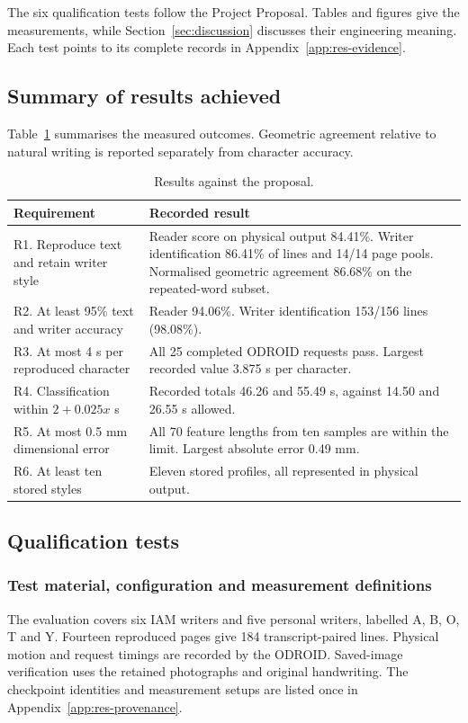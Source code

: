 \label{sec:results}
The six qualification tests follow the Project Proposal. Tables and figures give the measurements, while Section~\ref{sec:discussion} discusses their engineering meaning. Each test points to its complete records in Appendix~\ref{app:res-evidence}.

\subsection{Summary of results achieved}
\label{sec:res-summary}
Table~\ref{tab:res-summary} summarises the measured outcomes. Geometric agreement relative to natural writing is reported separately from character accuracy.
\begin{table}[!htbp]\centering\small
\begin{tabularx}{\linewidth}{p{.25\linewidth}X}\toprule
Requirement & Recorded result\\\midrule
R1. Reproduce text and retain writer style & Reader score on physical output 84.41\%. Writer identification 86.41\% of lines and 14/14 page pools. Normalised geometric agreement 86.68\% on the repeated-word subset.\\[3pt]
R2. At least 95\% text and writer accuracy & Reader 94.06\%. Writer identification 153/156 lines (98.08\%).\\[3pt]
R3. At most 4 s per reproduced character & All 25 completed ODROID requests pass. Largest recorded value 3.875 s per character.\\[3pt]
R4. Classification within $2+0.025x$ s & Recorded totals 46.26 and 55.49 s, against 14.50 and 26.55 s allowed.\\[3pt]
R5. At most 0.5 mm dimensional error & All 70 feature lengths from ten samples are within the limit. Largest absolute error 0.49 mm.\\[3pt]
R6. At least ten stored styles & Eleven stored profiles, all represented in physical output.\\\bottomrule
\end{tabularx}
\caption{Results against the proposal.}\label{tab:res-summary}
\end{table}
\FloatBarrier

\subsection{Qualification tests}
\label{sec:res-qtp}
\subsubsection{Test material, configuration and measurement definitions}
\label{sec:res-method}
The evaluation covers six IAM writers and five personal writers, labelled A, B, O, T and Y. Fourteen reproduced pages give 184 transcript-paired lines. Physical motion and request timings are recorded by the ODROID. Saved-image verification uses the retained photographs and original handwriting. The checkpoint identities and measurement setups are listed once in Appendix~\ref{app:res-provenance}.

